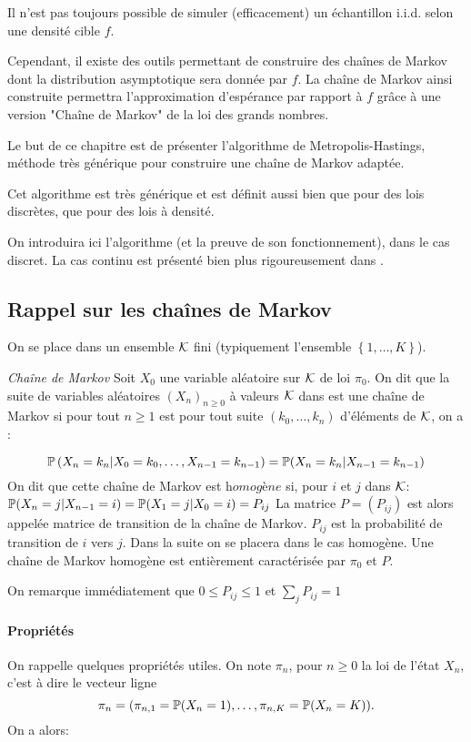 Il n'est pas toujours possible de simuler (efficacement) un échantillon i.i.d. selon une densité cible $f$.

Cependant, il existe des outils permettant de construire des chaînes de Markov dont la distribution asymptotique sera donnée par $f$. 
La chaîne de Markov ainsi construite permettra l'approximation d'espérance par rapport à $f$ grâce à une version "Chaîne de Markov" de la loi des grands nombres.

Le but de ce chapitre est de présenter l'algorithme de Metropolis-Hastings, méthode très générique pour construire une chaîne de Markov adaptée. 

Cet algorithme est très générique et est définit aussi bien que pour des lois discrètes, que pour des lois à densité.

On introduira ici l'algorithme (et la preuve de son fonctionnement), dans le cas discret. La cas continu est présenté bien plus rigoureusement dans \citep{robert2013monte}.


\subsection{Rappel sur les chaînes de Markov}
On se place dans un ensemble $\mathcal{K}$ fini (typiquement l'ensemble $\left\lbrace 1,\dots, K\right\rbrace$).

\begin{definition}{\textit{Chaîne de Markov}}
Soit $X_0$ une variable aléatoire sur $\mathcal{K}$ de loi $\pi_0$.
On dit que la suite de variables aléatoires $(X_n)_{n\geq 0}$ à valeurs $\mathcal{K}$ dans est une chaîne de Markov si pour tout $n\geq 1$ est pour tout suite $(k_0,\dots,k_n)$ d'éléments de $\mathcal{K}$, on a :

$$\mathbb{P}\left( X_n = k_n \vert X_0 = k_0,\dots,X_{n- 1} = k_{n- 1}\right) = \mathbb{P}(X_n = k_n \vert X_{n-1} = k_{n-1})$$
On dit que cette chaîne de Markov est $\textit{homogène}$ si, pour $i$ et $j$ dans $\mathcal{K}$: 
 $\mathbb{P}(X_n = j \vert X_{n-1} = i) = \mathbb{P}(X_1 = j \vert X_{0} = i) = P_{ij}$
 La matrice $P = (P_{ij})$ est alors appelée matrice de transition de la chaîne de Markov. $P_{ij}$ est la probabilité de transition de $i$ vers $j$. Dans la suite on se placera dans le cas homogène.
 Une chaîne de Markov homogène est entièrement caractérisée par $\pi_0$ et $P$.
 
 On remarque immédiatement que $0 \leq P_{ij}\leq 1 $ et $\sum_{j}P_{ij} = 1$ 
\end{definition}

\paragraph{Propriétés} On rappelle quelques propriétés utiles.
On note $\pi_n$, pour $n \geq 0$ la loi de l'état $X_n$, c'est à dire le vecteur ligne $$\pi_n = (\pi_{n,1} = \mathbb{P}(X_n = 1),\dots,\pi_{n, K} = \mathbb{P}(X_n = K)).$$
On a alors:


